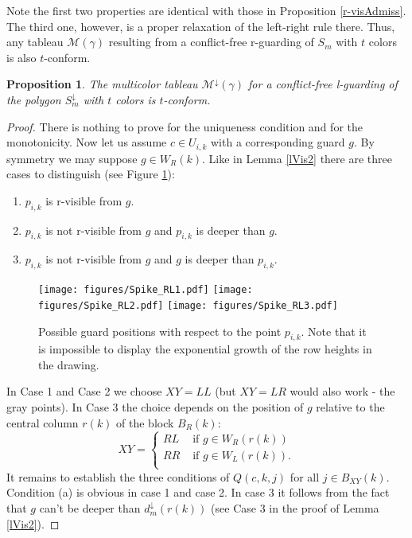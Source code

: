 \documentclass[a4paper,USenglish,numberwithinsect]{lipics}
\theoremstyle{plain}
\newtheorem{proposition}[theorem]{Proposition}
\begin{document}
Note the first two properties are identical with
those 
in Proposition \ref{r-visAdmiss}.
The third one, however,  is a proper relaxation of the left-right rule  there.
Thus, any tableau ${\mathcal M}(\gamma)$ resulting from a conflict-free
r-guarding
of $S_m$ with $t$ colors is also $t$-conform.
\begin{proposition} \label{l-visAdmiss}
The multicolor tableau  ${\mathcal M}^{\downarrow}(\gamma)$ for a
conflict-free
l-guarding of the polygon $S_m^{\downarrow}$ with $t$ colors is
$t$-conform.
\end{proposition}
\begin{proof}
There is nothing to prove for the uniqueness condition and for the
monotonicity.
Now let us assume $c \in U_{i,k}$ with a
corresponding guard $g$.
By symmetry we may suppose $g \in W_R(k)$. Like in  Lemma
\ref{lVis2}
there are three cases to distinguish (see Figure \ref{three_guard_pos}):
\begin{enumerate}
\item $p_{i,k}$ is r-visible from $g$.
\item $p_{i,k}$ is not r-visible from $g$ and $p_{i,k}$ is deeper than $g$.
\item  $p_{i,k}$ is not r-visible from $g$ and $g$ is deeper than $p_{i,k}$.
\end{enumerate}
\begin{figure}
\centering
\texttt{[image: figures/Spike\_RL1.pdf]}\quad\quad
\texttt{[image: figures/Spike\_RL2.pdf]}
\texttt{[image: figures/Spike\_RL3.pdf]}
\caption{Possible guard positions  with respect to the
point $p_{i,k}$. Note that it is impossible to
  display the exponential growth of the row heights in the drawing.}
\label{three_guard_pos}
\end{figure}
In Case 1 and Case 2 we choose $XY=LL$ (but $XY=LR$ would also work -
the gray points).
In Case 3 the choice depends on the position of $g$ relative to the central
column $r(k)$ of the block $B_R(k)$:
\[XY= \left\{ \begin{array}{ll}
  RL & \mbox{ if } g \in W_R(r(k)) \\
  RR & \mbox{ if } g \in W_L(r(k)). \\
\end{array} \right.
\]
It remains to establish the three conditions of $Q(c,k,j)$ for all
$j \in B_{XY}(k)$. Condition (a) is obvious in case 1 and case 2. In
case 3 it follows from
the fact that $g$ can't be deeper than $d_m^{\downarrow}(r(k))$ (see
Case 3 in the proof of
Lemma \ref{lVis2}).

\end{proof}
\end{document}
